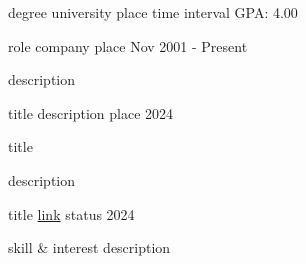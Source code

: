 \documentclass[11pt, a4paper]{awesome-cv}
\begin{document}
\makecvheader[C]


\begin{cventries}
    \cventry
    {degree}
    {university}
    {place}
    {time interval}
    {GPA: 4.00}
\end{cventries}


\begin{cventries}
    \cventry
    {role}
    {company}
    {place}
    {Nov 2001 - Present}
    {
    \begin{cvitems}
        \item {description}
    \end{cvitems}
    }
\end{cventries}


\begin{cvhonors}
    \cvhonor
    {title}
    {description}
    {place}
    {2024}
\end{cvhonors}


\begin{cventries}
    \cventryshort
    {title}
    {\href{link}{\textcolor{awesome-skyblue}{\faGithub}}}
    {
    \begin{cvitems}
        \item {description}
    \end{cvitems}
    }
\end{cventries}


\begin{cvhonors}
    \cvhonor
    {title}
    {\href{link}{link}}
    {status}
    {2024}
\end{cvhonors}


\begin{cvskillswithbox}
    \cvskillwithbox
    {skill \& interest}
    {description}
    {}
\end{cvskillswithbox}
\end{document}
